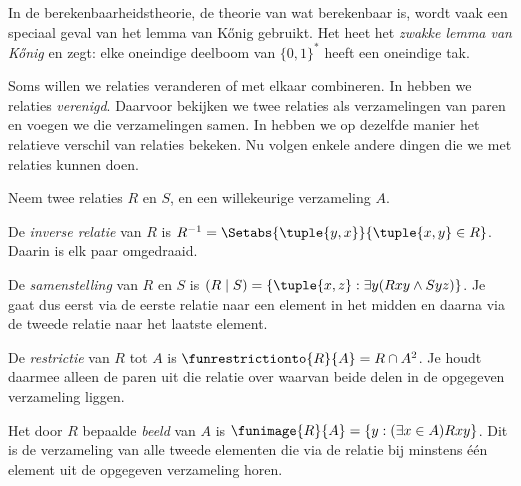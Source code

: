 \documentclass[openany]{memoir}
\begin{document}
In de berekenbaarheidstheorie, de theorie van wat berekenbaar is, wordt
vaak een speciaal geval van het lemma van K\H{o}nig gebruikt. Het heet
het \emph{zwakke lemma van
K\H{o}nig} en zegt: elke oneindige deelboom van $\{0,1\}^*$ heeft een
oneindige tak.
\endgroup

\begingroup
\def\olfilename{OLP-0019}
\def\olfilepath{content/sets-functions-relations/relations/}
\hypertarget{unit-OLP-0019}{}




Soms willen we relaties veranderen of met elkaar combineren. In
 hebben we relaties \emph{verenigd}.
Daarvoor bekijken we twee relaties als verzamelingen van paren en voegen we die
verzamelingen samen. In  hebben we
op dezelfde manier het relatieve verschil van relaties bekeken. Nu volgen
enkele andere dingen die we met relaties kunnen doen.

\begin{defn} 
Neem twee relaties $R$ en $S$, en een willekeurige verzameling $A$.

De \emph{inverse relatie} van $R$ is $R^{-1} = \Setabs{\tuple{y, x}}{\tuple{x,
    y} \in R}$. Daarin is elk paar omgedraaid.

De \emph{samenstelling} van $R$ en $S$ is $(R \mid S) =
\{\tuple{x, z} : \exists y(Rxy \land Syz)\}$. Je gaat dus eerst via de
eerste relatie naar een element in het midden en daarna via de tweede relatie
naar het laatste element.

De \emph{restrictie} van $R$ tot $A$ is $\funrestrictionto{R}{A}= R
\cap A^2$. Je houdt daarmee alleen de paren uit die relatie over waarvan
beide delen in de opgegeven verzameling liggen.

Het door $R$ bepaalde \emph{beeld} van $A$ is $\funimage{R}{A} = \{y :
(\exists x \in A)Rxy\}$. Dit is de verzameling van alle tweede elementen die
via de relatie bij minstens één element uit de opgegeven verzameling horen.
\end{defn}
\end{document}
